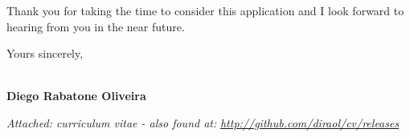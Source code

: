 \documentclass[]{friggeri-cover-letter}
\begin{document}
Thank you for taking the time to consider this application and I look forward to hearing from you in the near future.

\vfill

\hfill Yours sincerely,

~\\

\hfill \textbf{Diego Rabatone Oliveira}

\vfill

\footnotesize{\thinfont\color{lightgray}\textit{Attached: curriculum vitae - also found at:} \textit{\url{http://github.com/diraol/cv/releases}}}
\end{document}
